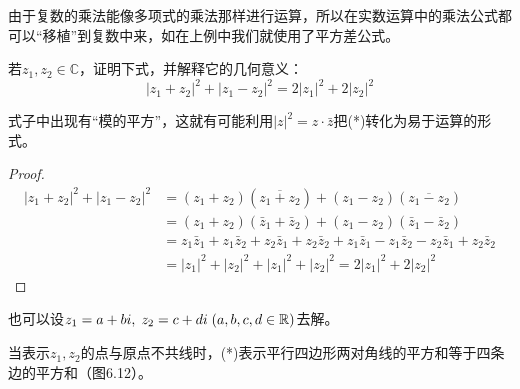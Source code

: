 \begin{remark}
由于复数的乘法能像多项式的乘法那样进行运算，所以在实数运算中的乘法公式都可以“移植”到复数中来，如在上例中我们就使用了平方差公式。
\end{remark}

\begin{example}
若$z_1,z_2\in\mathbb{C}$，证明下式，并解释它的几何意义：
\begin{equation}
  |z_1+z_2|^2+|z_1-z_2|^2=2|z_1|^2+2|z_2|^2  \tag{*}
\end{equation}
\end{example}

\begin{analyze}
式子中出现有“模的平方”，这就有可能利用$|z|^2=z\cdot \bar z$把(*)转化为易于运算的形式。
\end{analyze}

\begin{proof}
\[\begin{split}
    |z_1+z_2|^2+|z_1-z_2|^2&=(z_1+z_2)(\overline{z_1+z_2})+(z_1-z_2)(\overline{z_1-z_2})\\
&= (z_1+z_2)(\bar z_1+\bar z_2)+(z_1-z_2)(\bar z_1-\bar z_2)\\
&    =z_1\bar z_1+z_1\bar z_2+z_2\bar z_1+z_2\bar z_2+z_1\bar z_1-z_1\bar z_2-z_2\bar z_1+z_2\bar z_2\\
   & =|z_1|^2+|z_2|^2+|z_1|^2+|z_2|^2=2|z_1|^2+2|z_2|^2
\end{split}\]
\end{proof}    
    
\begin{analyze}
也可以设$z_1=a+bi,\; z_2=c+di\; (a,b,c,d\in\mathbb{R})$去解。

    当表示$z_1,z_2$的点与原点不共线时，(*)表示平行四边形两对角线的平方和等于四条边的平方和（图6.12）。   
\end{analyze}

\begin{figure}[htp]
    \centering
{}
    \caption{}
\end{figure}

